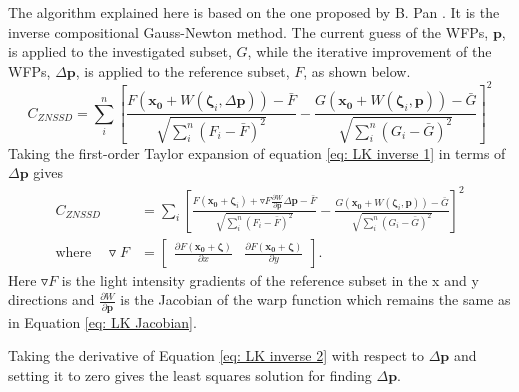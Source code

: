 \documentclass[12pt,oneside,openany,a4paper, %
english, %
masters-t, goldenblock]{usthesis}
\newcommand*\mean[1]{\bar{#1}} %
\begin{document}
The algorithm explained here is based on the one proposed by B. Pan \cite{panfast}. It is the inverse compositional Gauss-Newton method. %
The current guess of the WFPs, $\bm{p}$, is applied to the investigated subset, $G$, while the iterative improvement of the WFPs, $\Delta \bm{p}$, is applied to the reference subset, $F$, as shown below.
\begin{equation}
  C_{ZNSSD} = \sum_i^n  \left[ \frac{F(\bm{x_0}+W(\bm{\zeta}_i,\Delta \bm{p}))-\mean{F}}{\sqrt{\sum_i^n (F_i-\mean{F})^2}} -\frac{G(\bm{x_0}+W(\bm{\zeta}_i,\bm{p}))-\mean{G}}{\sqrt{\sum_i^n (G_i-\mean{G})^2}}\right]^2
  \label{eq: LK inverse 1}
\end{equation}
Taking the first-order Taylor expansion of equation \ref{eq: LK inverse 1} in terms of $\Delta \bm{p}$ gives
\begin{align}
  C_{ZNSSD} &= \sum_{i}  \left[ \frac{F(\bm{x_0}+\bm{\zeta}_i)+\triangledown F \frac{\partial W}{\partial \bm{p}} \Delta\bm{p}-\mean{F}}{\sqrt{\sum_i^n (F_i-\mean{F})^2}} -\frac{G(\bm{x_0}+W(\bm{\zeta}_i,\bm{p}))-\mean{G}}{\sqrt{\sum_i^n (G_i-\mean{G})^2}}\right]^2
  \label{eq: LK inverse 2} \\
  \text{where} \quad \triangledown F &= \begin{bmatrix} \frac{\partial F(\bm{x_0} + \bm{\zeta})}{\partial x} & \frac{\partial F(\bm{x_0} + \bm{\zeta})}{\partial y} \end{bmatrix}.
\end{align}
Here $\triangledown F$ is the light intensity gradients of the reference subset in the x and y directions and $\frac{\partial W}{\partial \bm{p}}$ is the Jacobian of the warp function which remains the same as in Equation \ref{eq: LK Jacobian}.

Taking the derivative of Equation \ref{eq: LK inverse 2} with respect to $\Delta \bm{p}$ and setting it to zero gives the least squares solution for finding $\Delta \bm{p}$.
\end{document}
